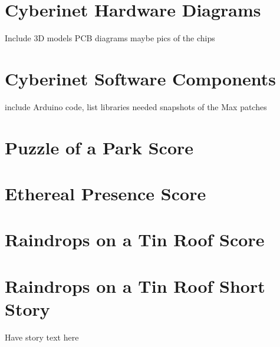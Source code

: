 \appendix

\chapter{Cyberinet Hardware Diagrams}
Include 3D models
PCB diagrams
maybe pics of the chips

\chapter{Cyberinet Software Components}
include Arduino code, list libraries needed
snapshots of the Max patches

\chapter{Puzzle of a Park Score}



\chapter{Ethereal Presence Score}



\chapter{Raindrops on a Tin Roof Score}



\chapter{Raindrops on a Tin Roof Short Story}
Have story text here






